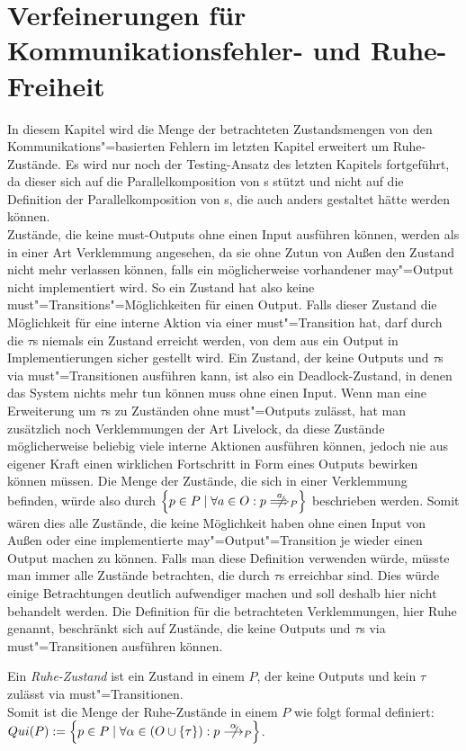\chapter{Verfeinerungen für Kommunikationsfehler- und Ruhe-Freiheit}


In diesem Kapitel wird die Menge der betrachteten Zustandsmengen von den
Kommunikations"=basierten Fehlern im letzten Kapitel erweitert um
Ruhe-Zustände. Es wird nur noch der Testing-Ansatz des letzten Kapitels
fortgeführt, da dieser sich auf die Parallelkomposition von \EIO{}s stützt und
nicht auf die Definition der Parallelkomposition von \MEIO{}s, die auch anders
gestaltet hätte werden können.\\
Zustände, die keine must-Outputs ohne einen Input ausführen können, werden als
in einer Art Verklemmung angesehen, da sie ohne Zutun von Außen den Zustand
nicht mehr verlassen können, falls ein möglicherweise vorhandener may"=Output
nicht implementiert wird. So ein Zustand hat also keine
must"=Transitions"=Möglichkeiten für einen Output. Falls dieser Zustand die
Möglichkeit für eine interne Aktion via einer must"=Transition hat, darf durch
die $\tau$s niemals ein Zustand erreicht werden, von dem aus ein Output in
Implementierungen sicher gestellt wird. Ein Zustand, der keine Outputs und
$\tau$s via must"=Transitionen ausführen kann, ist also ein Deadlock-Zustand,
in denen das System nichts mehr tun können muss ohne einen Input. Wenn man eine
Erweiterung um $\tau$s zu Zuständen ohne must"=Outputs zulässt, hat man
zusätzlich noch Verklemmungen der Art Livelock, da diese Zustände
möglicherweise beliebig viele interne Aktionen ausführen können, jedoch nie aus
eigener Kraft einen wirklichen Fortschritt in Form eines Outputs bewirken
können müssen. Die Menge der Zustände, die sich in einer Verklemmung
befinden, würde also durch $\left\{p\in P\mid \forall a\in O: p\nweakmust[a]_P
\right\}$ beschrieben werden. Somit wären dies alle Zustände, die keine
Möglichkeit haben ohne einen Input von Außen oder eine implementierte
may"=Output"=Transition je wieder einen Output machen zu können. Falls man
diese Definition verwenden würde, müsste man immer alle Zustände betrachten,
die durch $\tau$s erreichbar sind. Dies würde einige Betrachtungen deutlich
aufwendiger machen und soll deshalb hier nicht behandelt werden. Die Definition
für die betrachteten Verklemmungen, hier Ruhe genannt, beschränkt sich auf
Zustände, die keine Outputs und $\tau$s via must"=Transitionen ausführen
können.

\begin{Def}[Ruhe]
  Ein \emph{Ruhe-Zustand} ist ein Zustand in einem \MEIO{} $P$, der keine
  Outputs und kein $\tau$ zulässt via must"=Transitionen.\\
  Somit ist die Menge der Ruhe-Zustände in einem \MEIO{} $P$ wie folgt formal
  definiert: $Qui(P):=\left\{p\in P\mid \forall\alpha\in (O\cup\{\tau\}):p
  \nmust[\alpha]_P\right\}$.
\end{Def}

